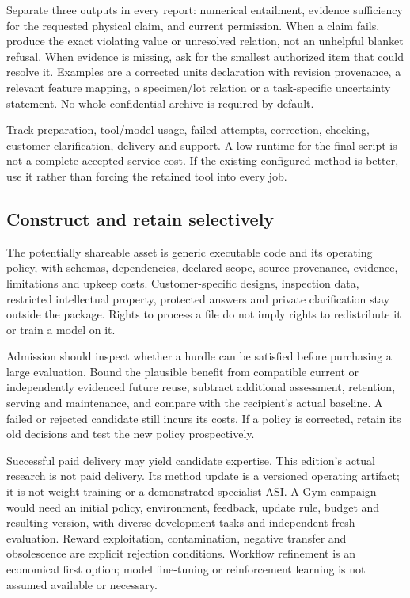 \documentclass[
  11pt,
]{article}
\let\OriginalSubsection\subsection
\renewcommand{\subsection}{\needspace{6\baselineskip}\OriginalSubsection}
\begin{document}
Separate three outputs in every report: numerical entailment, evidence
sufficiency for the requested physical claim, and current permission.
When a claim fails, produce the exact violating value or unresolved
relation, not an unhelpful blanket refusal. When evidence is missing,
ask for the smallest authorized item that could resolve it. Examples are
a corrected units declaration with revision provenance, a relevant
feature mapping, a specimen/lot relation or a task-specific uncertainty
statement. No whole confidential archive is required by default.

Track preparation, tool/model usage, failed attempts, correction,
checking, customer clarification, delivery and support. A low runtime
for the final script is not a complete accepted-service cost. If the
existing configured method is better, use it rather than forcing the
retained tool into every job.

\hypertarget{construct-and-retain-selectively}{%
\subsection{Construct and retain
selectively}\label{construct-and-retain-selectively}}

The potentially shareable asset is generic executable code and its
operating policy, with schemas, dependencies, declared scope, source
provenance, evidence, limitations and upkeep costs. Customer-specific
designs, inspection data, restricted intellectual property, protected
answers and private clarification stay outside the package. Rights to
process a file do not imply rights to redistribute it or train a model
on it.

Admission should inspect whether a hurdle can be satisfied before
purchasing a large evaluation. Bound the plausible benefit from
compatible current or independently evidenced future reuse, subtract
additional assessment, retention, serving and maintenance, and compare
with the recipient's actual baseline. A failed or rejected candidate
still incurs its costs. If a policy is corrected, retain its old
decisions and test the new policy prospectively.

Successful paid delivery may yield candidate expertise. This edition's
actual research is not paid delivery. Its method update is a versioned
operating artifact; it is not weight training or a demonstrated
specialist ASI. A Gym campaign would need an initial policy,
environment, feedback, update rule, budget and resulting version, with
diverse development tasks and independent fresh evaluation. Reward
exploitation, contamination, negative transfer and obsolescence are
explicit rejection conditions. Workflow refinement is an economical
first option; model fine-tuning or reinforcement learning is not assumed
available or necessary.
\end{document}

